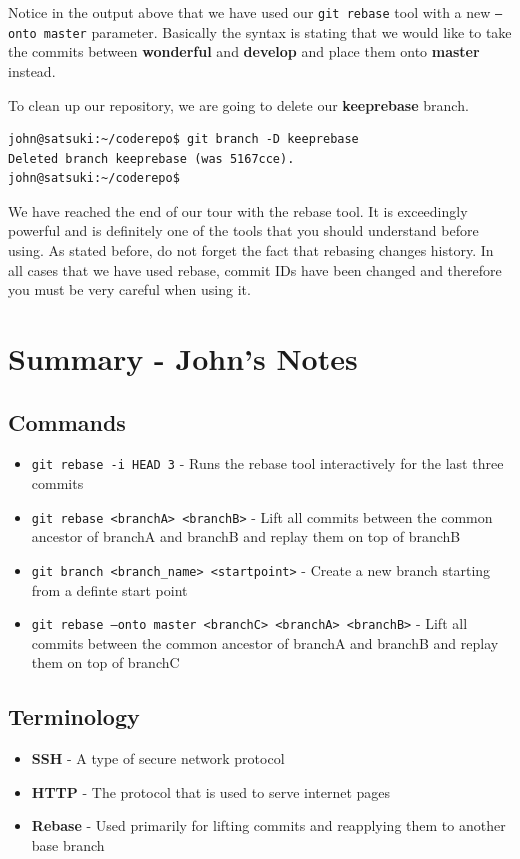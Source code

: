 Notice in the output above that we have used our \texttt{git rebase} tool with a new \texttt{--onto master} parameter.
Basically the syntax is stating that we would like to take the commits between \textbf{wonderful} and \textbf{develop} and place them onto \textbf{master} instead.

To clean up our repository, we are going to delete our \textbf{keeprebase} branch.

\begin{Verbatim}
john@satsuki:~/coderepo$ git branch -D keeprebase
Deleted branch keeprebase (was 5167cce).
john@satsuki:~/coderepo$
\end{Verbatim}

We have reached the end of our tour with the rebase tool.
It is exceedingly powerful and is definitely one of the tools that you should understand before using.
As stated before, do not forget the fact that rebasing changes history.
In all cases that we have used rebase, commit IDs have been changed and therefore you must be very careful when using it.

\clearpage

\section{Summary - John's Notes}
\subsection{Commands}
\begin{itemize}

\item\texttt{git rebase -i HEAD~3} - Runs the rebase tool interactively for the last three commits

\item\texttt{git rebase <branchA> <branchB>} - Lift all commits between the common ancestor of branchA and branchB and replay them on top of branchB

\item\texttt{git branch <branch\_name> <startpoint>} - Create a new branch starting from a definte start point

\item\texttt{git rebase --onto master <branchC> \newline <branchA> <branchB>} - Lift all commits between the common ancestor of branchA and branchB and replay them on top of branchC
\end{itemize}

\subsection{Terminology}
\begin{itemize}
\item\textbf{SSH} - A type of secure network protocol
\item\textbf{HTTP} - The protocol that is used to serve internet pages
\item\textbf{Rebase} - Used primarily for lifting commits and reapplying them to another base branch
\end{itemize}
